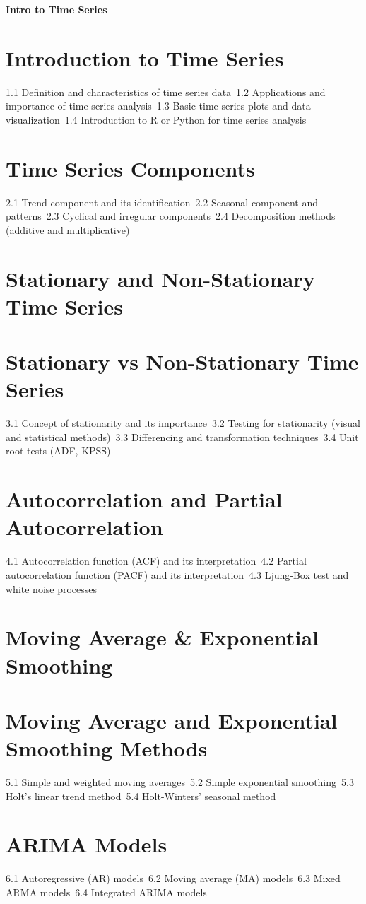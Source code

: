 {\LARGE \bf{Intro to Time Series}}
\section{Introduction to Time Series}
1.1 Definition and characteristics of time series data\
1.2 Applications and importance of time series analysis\
1.3 Basic time series plots and data visualization\
1.4 Introduction to R or Python for time series analysis\
\section{Time Series Components}
2.1 Trend component and its identification\
2.2 Seasonal component and patterns\
2.3 Cyclical and irregular components\
2.4 Decomposition methods (additive and multiplicative)\
\section{Stationary and Non-Stationary Time Series}
\section{Stationary vs Non-Stationary Time Series}
3.1 Concept of stationarity and its importance\
3.2 Testing for stationarity (visual and statistical methods)\
3.3 Differencing and transformation techniques\
3.4 Unit root tests (ADF, KPSS)\
\section{Autocorrelation and Partial Autocorrelation}
4.1 Autocorrelation function (ACF) and its interpretation\
4.2 Partial autocorrelation function (PACF) and its interpretation\
4.3 Ljung-Box test and white noise processes\
\section{Moving Average \& Exponential Smoothing}
\section{Moving Average and Exponential Smoothing Methods}
5.1 Simple and weighted moving averages\
5.2 Simple exponential smoothing\
5.3 Holt's linear trend method\
5.4 Holt-Winters' seasonal method\
\section{ARIMA Models}
6.1 Autoregressive (AR) models\
6.2 Moving average (MA) models\
6.3 Mixed ARMA models\
6.4 Integrated ARIMA models\
